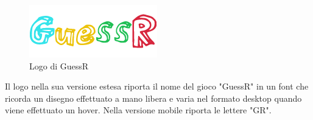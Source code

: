 \begin{figure}[H]
    \centering
    \includegraphics[width=0.4\linewidth]{img/screen/logoHover.png}
    \caption{Logo di GuessR} 
\end{figure}

\noindent Il logo nella sua versione estesa riporta il nome del gioco "GuessR" in un font che ricorda un disegno effettuato a mano libera e varia nel formato desktop quando viene effettuato un hover. Nella versione mobile riporta le lettere "GR".